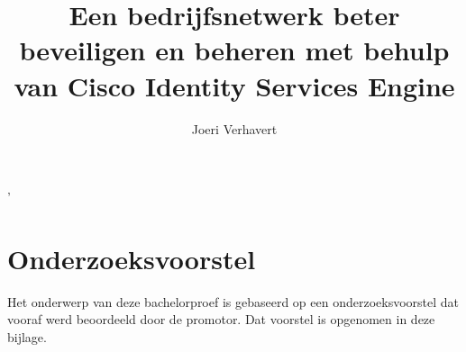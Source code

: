 \documentclass{bachproef-tin}
\title{Een bedrijfsnetwerk beter beveiligen en beheren met behulp van Cisco Identity Services Engine}
\author{Joeri Verhavert}
\begin{document}
\inserttitlepage

\usechapterimagefalse



\pagestyle{empty} %
\tableofcontents  %
\cleardoublepage  %
\pagestyle{fancy} %



\listoffigures
\listoftables







'

\appendix
\renewcommand{\chaptername}{Appendix}


\chapter{Onderzoeksvoorstel}

Het onderwerp van deze bachelorproef is gebaseerd op een onderzoeksvoorstel dat vooraf werd beoordeeld door de promotor. Dat voorstel is opgenomen in deze bijlage.






\printbibliography[heading=bibintoc]
\end{document}
